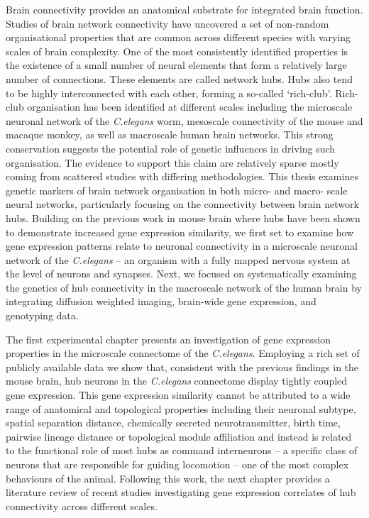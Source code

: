 
\vspace*{20mm}

\vspace{10mm}

Brain connectivity provides an anatomical substrate for integrated brain function. Studies of brain network connectivity have uncovered a set of non-random organisational properties that are common across different species with varying scales of brain complexity. One of the most consistently identified properties is the existence of a small number of neural elements that form a relatively large number of connections. These elements are called network hubs. Hubs also tend to be highly interconnected with each other, forming a so-called `rich-club'. Rich-club organisation has been identified at different scales including the microscale neuronal network of the \textit{C.elegans} worm, mesoscale connectivity of the mouse and macaque monkey, as well as macroscale human brain networks. This strong conservation suggests the potential role of genetic influences in driving such organisation. The evidence to support this claim are relatively sparse mostly coming from scattered studies with differing methodologies. This thesis examines genetic markers of brain network organisation in both micro- and macro- scale neural networks, particularly focusing on the connectivity between brain network hubs. Building on the previous work in mouse brain where hubs have been shown to demonstrate increased gene expression similarity, we first set to examine how gene expression patterns relate to neuronal connectivity in a microscale neuronal network of the \textit{C.elegans} -- an organism with a fully mapped nervous system at the level of neurons and synapses. Next, we focused on systematically examining the genetics of hub connectivity in the macroscale network of the human brain by integrating diffusion weighted imaging, brain-wide gene expression, and genotyping data.

The first experimental chapter presents an investigation of gene expression properties in the microscale connectome of the \textit{C.elegans}. Employing a rich set of publicly available data we show that, consistent with the previous findings in the mouse brain, hub neurons in the \textit{C.elegans} connectome display tightly coupled gene expression. This gene expression similarity cannot be attributed to a wide range of anatomical and topological properties including their neuronal subtype, spatial separation distance, chemically secreted neurotransmitter, birth time, pairwise lineage distance or topological module affiliation and instead is related to the functional role of most hubs as command interneurons -- a specific class of neurons that are responsible for guiding locomotion -- one of the most complex behaviours of the animal. Following this work, the next chapter provides a literature review of recent studies investigating gene expression correlates of hub connectivity across different scales.

